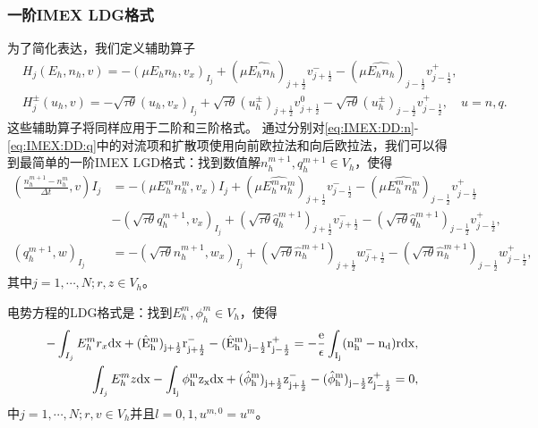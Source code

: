 \subsubsection{一阶IMEX LDG格式}
为了简化表达，我们定义辅助算子
\begin{align}
     & H_j(E_h,n_h,v)    = - (\mu E_h n_h, v_x)_{I_j} + (\mu \widehat{E_h n_h})_{j+\frac{1}{2}}v_{j+\frac{1}{2}}^- - (\mu \widehat{E_h n_h})_{j-\frac{1}{2}}v_{j-\frac{1}{2}}^+, \label{eq:IMEX:DD:notation:1}                                \\
     & H_j^{\pm}(u_h,v)  =- \sqrt{\tau \theta}(u_h,v_x)_{I_j} + \sqrt{\tau\theta}(u_h^{\pm})_{j+\frac{1}{2}}v_{j+\frac{1}{2}}^0 - \sqrt{\tau\theta}(u_h^{\pm})_{j-\frac{1}{2}}v_{j-\frac{1}{2}}^+,\quad u = n,q.\label{eq:IMEX:DD:notation:2}
\end{align}
这些辅助算子将同样应用于二阶和三阶格式。
通过分别对\eqref{eq:IMEX:DD:n}-\eqref{eq:IMEX:DD:q}中的对流项和扩散项使用向前欧拉法和向后欧拉法，我们可以得到最简单的一阶IMEX LGD格式：找到数值解$n_h^{m+1},q_h^{m+1}\in V_h$，使得
\begin{align}
    (\frac{n_h^{m+1} - n_h^m}{\Delta t},v)I_j & = -(\mu E_h^mn_h^m, v_x)I_j + (\mu \hat{E_h^mn_h^m})_{j+\frac{1}{2}}v_{j-\frac{1}{2}}^- - (\mu\hat{E_h^mn_h^m})_{j-\frac{1}{2}}v^+_{j-\frac{1}{2}}                                         \nonumber                 \\
                                              & -(\sqrt{\tau \theta}q_h^{m+1},v_x)_{I_j} + (\sqrt{\tau \theta}\hat{q}_h^{m+1})_{j+\frac{1}{2}}v_{j+\frac{1}{2}}^- - (\sqrt{\tau \theta}\hat{q}_h^{m+1})_{j-\frac{1}{2}}v_{j-\frac{1}{2}}^+,  \label{eq:IMEX:1:first} \\
    (q_h^{m+1},w)_{I_j}                       & = -(\sqrt{\tau \theta}n_h^{m+1},w_x)_{I_j} + (\sqrt{\tau \theta}\hat{n}_h^{m+1})_{j+\frac{1}{2}}w_{j+\frac{1}{2}}^- - (\sqrt{\tau \theta}\hat{n}_h^{m+1})_{j-\frac{1}{2}}w_{j-\frac{1}{2}}^+,
\end{align}
其中$j = 1,\cdots,N; r,z \in V_h$。

电势方程的LDG格式是：找到$E_h^{m},\phi_h^{m} \in V_h$，使得
\begin{align}
    -\int_{I_j} E_h^{m}r_x \rm{d}x + (\hat{E}_h^{m})_{j+\frac{1}{2}}r_{j+\frac{1}{2}}^- - (\hat{E}_h^{m})_{j-\frac{1}{2}}r_{j-\frac{1}{2}}^+ = -\frac{e}{\epsilon}\int_{I_j}(n_h^{m} - n_d) r\rm{d} x, \\
    \int_{I_j} E_h^{m}z \rm{d}x - \int_{I_j} \phi_h^{m}z_x \rm{d}x  + (\hat{\phi}_h^{m})_{j+\frac{1}{2}}z^-_{j+\frac{1}{2}} - (\hat{\phi}_h^{m})_{j-\frac{1}{2}}z_{j-\frac{1}{2}}^+  = 0,\label{eq:IMEX:1:last}
\end{align}
中$j = 1,\cdots,N; r,v \in V_h$并且$l = 0,1, u^{m,0} = u^m$。
